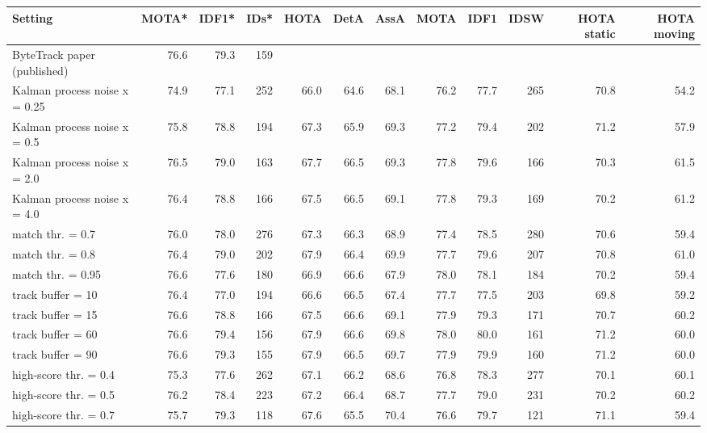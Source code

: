 \begin{tabular}{lrrrrrrrrrrr}
\toprule
Setting & MOTA* & IDF1* & IDs* & HOTA & DetA & AssA & MOTA & IDF1 & IDSW & HOTA static & HOTA moving \\
\midrule
ByteTrack paper (published) & 76.6 & 79.3 & 159 &  &  &  &  &  &  &  &  \\
Kalman process noise x = 0.25 & 74.9 & 77.1 & 252 & 66.0 & 64.6 & 68.1 & 76.2 & 77.7 & 265 & 70.8 & 54.2 \\
Kalman process noise x = 0.5 & 75.8 & 78.8 & 194 & 67.3 & 65.9 & 69.3 & 77.2 & 79.4 & 202 & 71.2 & 57.9 \\
Kalman process noise x = 2.0 & 76.5 & 79.0 & 163 & 67.7 & 66.5 & 69.3 & 77.8 & 79.6 & 166 & 70.3 & 61.5 \\
Kalman process noise x = 4.0 & 76.4 & 78.8 & 166 & 67.5 & 66.5 & 69.1 & 77.8 & 79.3 & 169 & 70.2 & 61.2 \\
match thr. = 0.7 & 76.0 & 78.0 & 276 & 67.3 & 66.3 & 68.9 & 77.4 & 78.5 & 280 & 70.6 & 59.4 \\
match thr. = 0.8 & 76.4 & 79.0 & 202 & 67.9 & 66.4 & 69.9 & 77.7 & 79.6 & 207 & 70.8 & 61.0 \\
match thr. = 0.95 & 76.6 & 77.6 & 180 & 66.9 & 66.6 & 67.9 & 78.0 & 78.1 & 184 & 70.2 & 59.4 \\
track buffer = 10 & 76.4 & 77.0 & 194 & 66.6 & 66.5 & 67.4 & 77.7 & 77.5 & 203 & 69.8 & 59.2 \\
track buffer = 15 & 76.6 & 78.8 & 166 & 67.5 & 66.6 & 69.1 & 77.9 & 79.3 & 171 & 70.7 & 60.2 \\
track buffer = 60 & 76.6 & 79.4 & 156 & 67.9 & 66.6 & 69.8 & 78.0 & 80.0 & 161 & 71.2 & 60.0 \\
track buffer = 90 & 76.6 & 79.3 & 155 & 67.9 & 66.5 & 69.7 & 77.9 & 79.9 & 160 & 71.2 & 60.0 \\
high-score thr. = 0.4 & 75.3 & 77.6 & 262 & 67.1 & 66.2 & 68.6 & 76.8 & 78.3 & 277 & 70.1 & 60.1 \\
high-score thr. = 0.5 & 76.2 & 78.4 & 223 & 67.2 & 66.4 & 68.7 & 77.7 & 79.0 & 231 & 70.2 & 60.2 \\
high-score thr. = 0.7 & 75.7 & 79.3 & 118 & 67.6 & 65.5 & 70.4 & 76.6 & 79.7 & 121 & 71.1 & 59.4 \\
\bottomrule
\end{tabular}
